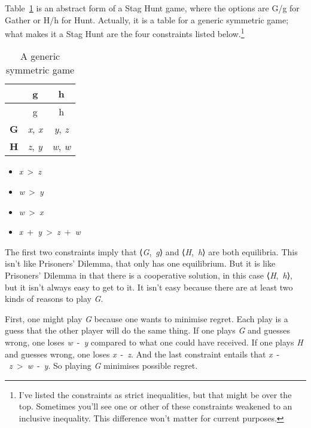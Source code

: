 \documentclass[
  10pt,
  letterpaper,
  DIV=11,
  numbers=noendperiod,
  twoside]{scrartcl}
\providecommand{\tightlist}{%
  \setlength{\itemsep}{0pt}\setlength{\parskip}{0pt}}\usepackage{longtable,booktabs,array}
\begin{document}
Table~\ref{tbl-generic} is an abstract form of a Stag Hunt game, where
the options are G/g for Gather or H/h for Hunt. Actually, it is a table
for a generic symmetric game; what makes it a Stag Hunt are the four
constraints listed below.\footnote{I've listed the constraints as strict
  inequalities, but that might be over the top. Sometimes you'll see one
  or other of these constraints weakened to an inclusive inequality.
  This difference won't matter for current purposes.}

\begin{longtable}[]{@{}lcc@{}}
\caption{A generic symmetric game}\label{tbl-generic}\tabularnewline
\toprule\noalign{}
& g & h \\
\midrule\noalign{}
\endfirsthead
\toprule\noalign{}
& g & h \\
\midrule\noalign{}
\endhead
\bottomrule\noalign{}
\endlastfoot
\textbf{G} & \emph{x}, \emph{x} & \emph{y}, \emph{z} \\
\textbf{H} & \emph{z}, \emph{y} & \emph{w}, \emph{w} \\
\end{longtable}

\begin{itemize}
\tightlist
\item
  \emph{x}~\textgreater~\emph{z}
\item
  \emph{w}~\textgreater~\emph{y}
\item
  \emph{w}~\textgreater~\emph{x}
\item
  \emph{x}~+~\emph{y}~\textgreater~\emph{z}~+~\emph{w}
\end{itemize}

The first two constraints imply that ⟨\emph{G},~\emph{g}⟩ and
⟨\emph{H},~\emph{h}⟩ are both equilibria. This isn't like Prisoners'
Dilemma, that only has one equilibrium. But it is like Prisoners'
Dilemma in that there is a cooperative solution, in this case
⟨\emph{H},~\emph{h}⟩, but it isn't always easy to get to it. It isn't
easy because there are at least two kinds of reasons to play \emph{G}.

First, one might play \emph{G} because one wants to minimise regret.
Each play is a guess that the other player will do the same thing. If
one plays \emph{G} and guesses wrong, one loses \emph{w}~-~\emph{y}
compared to what one could have received. If one plays \emph{H} and
guesses wrong, one loses \emph{x}~-~\emph{z}. And the last constraint
entails that \emph{x}~-~\emph{z}~\textgreater~\emph{w}~-~\emph{y}. So
playing \emph{G} minimises possible regret.
\end{document}
